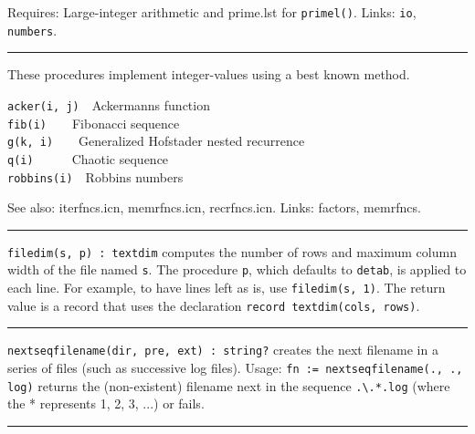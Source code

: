 Requires: Large-integer arithmetic and prime.lst for
\texttt{primel()}. Links: \texttt{io}, \texttt{numbers}.

\vspace{0.25cm}\hrule{}

These procedures implement integer-values using a best known method.

\texttt{acker(i, j)}\ \ Ackermann{\textquotesingle}s function\\
\texttt{fib(i)}\ \ \ \ Fibonacci sequence\\
\texttt{g(k, i)}\ \ \ \ Generalized Hofstader nested recurrence\\
\texttt{q(i)}\ \ \ \ \ \ {\textquotedbl}Chaotic{\textquotedbl}
sequence\\
\texttt{robbins(i)}\ \ Robbins numbers

See also: iterfncs.icn, memrfncs.icn, recrfncs.icn. Links: factors,
memrfncs. 

\vspace{0.25cm}\hrule{}

\texttt{filedim(s, p) : textdim} computes the number of rows and maximum
column width of the file named \texttt{s}. The procedure \texttt{p},
which defaults to \texttt{detab}, is applied to each line. For example,
to have lines left as is, use \texttt{filedim(s, 1)}. The return value
is a record that uses the declaration \texttt{record textdim(cols,
rows)}. 

\vspace{0.25cm}\hrule{}

\texttt{nextseqfilename(dir, pre, ext) : string?} creates the next
filename in a series of files (such as successive
log files). Usage: \texttt{fn :=
nextseqfilename({\textquotedbl}.{\textquotedbl},
{\textquotedbl}.{\textquotedbl}, {\textquotedbl}log{\textquotedbl})}
returns the (non-existent) filename next in the sequence
\texttt{.{\textbackslash}.*.log} (where the * represents 1, 2, 3, ...)
or fails.

\vspace{0.25cm}\hrule{}

